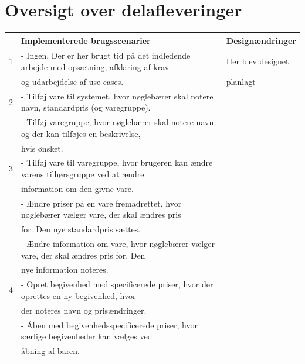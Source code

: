 \documentclass[]{article}
\begin{document}
\pagebreak[3]



\newpage  %


\appendix

\section{Oversigt over delafleveringer}
\begin{table}[!h]
\centering
\begin{tabular}{|l|l|l|} \hline
& \textbf{Implementerede brugsscenarier} & \textbf{Designændringer}  \\ \hline
1 & - Ingen. Der er her brugt tid på det indledende arbejde med opsætning, afklaring af krav & Her blev designet  \\
  & og udarbejdelse af use cases. & planlagt \\ \hline
2 &	- Tilføj vare til systemet, hvor nøglebærer skal notere navn, standardpris (og varegruppe).&  \\
  & - Tilføj varegruppe, hvor nøglebærer skal notere navn og der kan tilføjes en beskrivelse, & \\
  & hvis ønsket. &  \\ \hline
3 & - Tilføj vare til varegruppe, hvor brugeren kan ændre varens tilhørsgruppe ved at ændre &  \\
  & information om den givne vare. & \\
  & - Ændre priser på en vare fremadrettet, hvor nøglebærer vælger vare, der skal ændres pris & \\
  & for. Den nye standardpris sættes. & \\
  & - Ændre information om vare, hvor nøglebærer vælger vare, der skal ændres pris for. Den & \\ 
  & nye information noteres. & \\ \hline
4 & - Opret begivenhed med specificerede priser, hvor der oprettes en ny begivenhed, hvor &  \\
  & der noteres navn og prisændringer. & \\
  & - Åben med begivenhedsspecificerede priser, hvor 
  særlige begivenheder kan vælges ved & \\
  & åbning af baren. & \\

\end{tabular}
\end{table}
\end{document}
